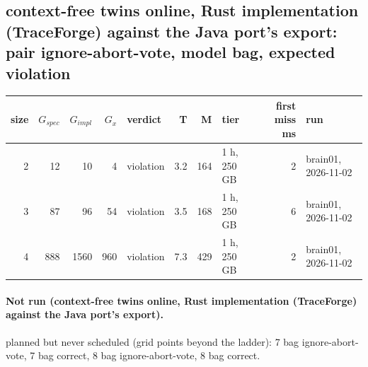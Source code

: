 \documentclass[10pt]{article}
\begin{document}
\subsection*{context-free twins online, Rust implementation (TraceForge) against the Java port's export: pair \textsf{ignore-abort-vote}, model bag, expected violation}
\begin{longtable}{@{}rrrrlrrlrl@{}}
\toprule
size & $G_{\mathit{spec}}$ & $G_{\mathit{impl}}$ & $G_x$ & verdict & T & M & tier & first miss ms & run \\
\midrule
\endhead
\color{red} 2 & 12 & 10 & 4 & violation & 3.2 & 164 & 1 h, 250 GB & 2 & brain01, 2026-11-02 \\
\color{red} 3 & 87 & 96 & 54 & violation & 3.5 & 168 & 1 h, 250 GB & 6 & brain01, 2026-11-02 \\
\color{red} 4 & 888 & 1560 & 960 & violation & 7.3 & 429 & 1 h, 250 GB & 2 & brain01, 2026-11-02 \\
\bottomrule
\end{longtable}
\paragraph{Not run (context-free twins online, Rust implementation (TraceForge) against the Java port's export).}
planned but never scheduled (grid points beyond the ladder): 7 bag ignore-abort-vote, 7 bag correct, 8 bag ignore-abort-vote, 8 bag correct.\par
\end{document}
